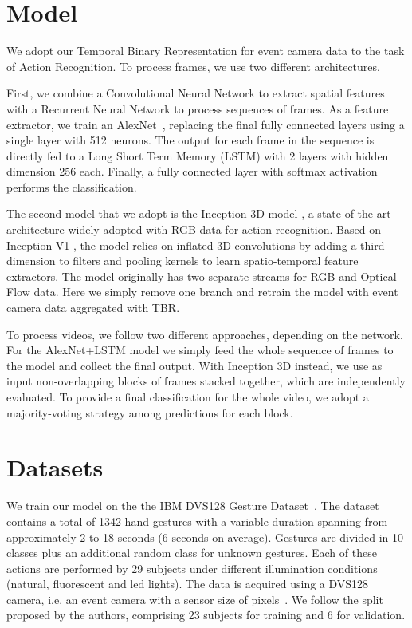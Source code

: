 \documentclass[a4paper,conference]{IEEEtran}
\begin{document}
\section{Model}
\label{sec:model}
We adopt our Temporal Binary Representation for event camera data to the task of Action Recognition. To process frames, we use two different architectures.

First, we combine a Convolutional Neural Network to extract spatial features with a Recurrent Neural Network to process sequences of frames. As a feature extractor, we train an AlexNet~\cite{krizhevsky2012imagenet}, replacing the final fully connected layers using a single layer with 512 neurons. The output for each frame in the sequence is directly fed to a Long Short Term Memory (LSTM) with 2 layers with hidden dimension 256 each. Finally, a fully connected layer with softmax activation performs the classification.

The second model that we adopt is the Inception 3D model \cite{carreira2017quo}, a state of the art architecture widely adopted with RGB data for action recognition. Based on Inception-V1 \cite{szegedy2015going}, the model relies on inflated 3D convolutions by adding a third dimension to filters and pooling kernels to learn spatio-temporal feature extractors. The model originally has two separate streams for RGB and Optical Flow data. Here we simply remove one branch and retrain the model with event camera data aggregated with TBR.

To process videos, we follow two different approaches, depending on the network. For the AlexNet+LSTM model we simply feed the whole sequence of frames to the model and collect the final output. With Inception 3D instead, we use as input non-overlapping blocks of  frames stacked together, which are independently evaluated. To provide a final classification for the whole video, we adopt a majority-voting strategy among predictions for each block.



\section{Datasets}
\label{sec:dataset}
We train our model on the the IBM DVS128 Gesture Dataset~\cite{amir2017low}. The dataset contains a total of 1342 hand gestures with a variable duration spanning from approximately 2 to 18 seconds (6 seconds on average). Gestures are divided in 10 classes plus an additional random class for unknown gestures. Each of these actions are performed by 29 subjects under different illumination conditions (natural, fluorescent and led lights). The data is acquired using a DVS128 camera, i.e. an event camera with a sensor size of  pixels~\cite{lichtsteiner2006128}. We follow the split proposed by the authors, comprising 23 subjects for training and 6 for validation.
\end{document}
